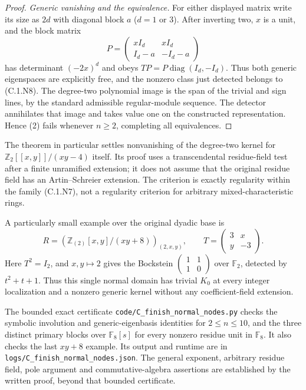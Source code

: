 \begin{proof}
\emph{Generic vanishing and the equivalence.}
For either displayed matrix write its size as $2d$ with
diagonal block $a$ ($d=1$ or $3$). After inverting two,
$x$ is a unit, and the block matrix
\[
       P=\begin{pmatrix}xI_d&xI_d\\I_d-a&-I_d-a\end{pmatrix}
\]
has determinant $(-2x)^d$ and obeys
$TP=P\operatorname{diag}(I_d,-I_d)$.
Thus both generic eigenspaces are explicitly free, and the
nonzero class just detected belongs to (C.1.N8).
The degree-two polynomial image is the span of the trivial
and sign lines, by the standard admissible regular-module
sequence. The detector annihilates that image and takes
value one on the constructed representation. Hence (2)
fails whenever $n\ge2$, completing all equivalences.
\end{proof}

The theorem in particular settles nonvanishing of the degree-two kernel for
$\mathbb Z_2[[x,y]]/(xy-4)$ itself. Its proof uses a
transcendental residue-field test after a finite unramified
extension; it does not assume that the original residue field
has an Artin--Schreier extension. The criterion is exactly
regularity within the family (C.1.N7), not a regularity
criterion for arbitrary mixed-characteristic rings.

A particularly small example over the original dyadic base is
\[
 R=\left(\mathbb Z_{(2)}[x,y]/(xy+8)\right)_{(2,x,y)},
 \qquad T=\begin{pmatrix}3&x\\y&-3\end{pmatrix}.
\]
Here $T^2=I_2$, and $x,y\mapsto2$ gives the Bockstein
$\left(\begin{smallmatrix}1&1\\1&0\end{smallmatrix}\right)$
over $\mathbb F_2$, detected by $t^2+t+1$.
Thus this single normal domain has trivial $K_0$ at every
integer localization and a nonzero generic kernel without
any coefficient-field extension.

The bounded exact certificate
\texttt{code/C\_finish\_normal\_nodes.py} checks the symbolic
involution and generic-eigenbasis identities for $2\le n\le10$,
and the three distinct primary blocks over $\mathbb F_8[s]$
for every nonzero residue unit in $\mathbb F_8$.
It also checks the last $xy+8$ example. Its output and runtime
are in \texttt{logs/C\_finish\_normal\_nodes.json}.
The general exponent, arbitrary residue field, pole argument
and commutative-algebra assertions are established by the
written proof, beyond that bounded certificate.
